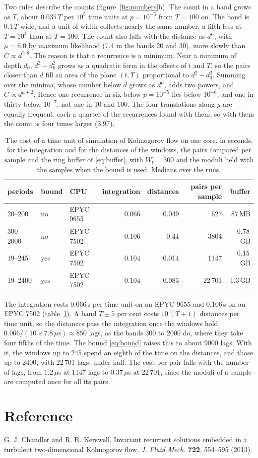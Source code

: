 \documentclass[11pt]{article}
\begin{document}
Two rules describe the counts (figure~\ref{fig:numbers}b). The count in a band grows as $T$, about $0.035\,T$ per $10^5$ time units at $p = 10^{-5}$ from $T = 100$ on. The band is $0.1\,T$ wide, and a unit of width collects nearly the same number, a fifth less at $T = 10^4$ than at $T = 100$. The count also falls with the distance as $d^{\mu}$, with $\mu = 6.0$ by maximum likelihood (7.4 in the bands 20 and 30), more slowly than $C \propto d^{7\text{--}8}$. The reason is that a recurrence is a minimum. Near a minimum of depth $d_0$, $d^2 - d_0^2$ grows as a quadratic form in the offsets of $t$ and $T$, so the pairs closer than $d$ fill an area of the plane $(t, T)$ proportional to $d^2 - d_0^2$. Summing over the minima, whose number below $d$ grows as $d^{\mu}$, adds two powers, and $C \propto d^{\mu + 2}$. Hence one recurrence in six below $p = 10^{-5}$ lies below $10^{-6}$, and one in thirty below $10^{-7}$, not one in 10 and 100. The four translations along $y$ are equally frequent, each a quarter of the recurrences found with them, so with them the count is four times larger (3.97).

\begin{table}[t]
\centering
\caption{The cost of a time unit of simulation of Kolmogorov flow on one core, in seconds, for the integration and for the distances of the windows, the pairs compared per sample and the ring buffer of \eqref{eq:buffer}, with $W_t = 300$ and the moduli held with the samples when the bound is used. Medians over the runs.}
\label{tab:cost}
\small
\begin{tabular}{l l l r r r r}
\toprule
periods & bound & CPU & integration & distances & pairs per sample & buffer \\
\midrule
20--200 & no & EPYC 9655 & 0.066 & 0.049 & 627 & 87\,MB \\
300--2000 & no & EPYC 7502 & 0.106 & 0.44 & 3804 & 0.78\,GB \\
19--245 & yes & EPYC 7502 & 0.104 & 0.014 & 1147 & 0.15\,GB \\
19--2400 & yes & EPYC 7502 & 0.104 & 0.083 & 22\,701 & 1.3\,GB \\
\bottomrule
\end{tabular}
\end{table}

The integration costs 0.066\,s per time unit on an EPYC 9655 and 0.106\,s on an EPYC 7502 (table~\ref{tab:cost}). A band $T \pm 5$ per cent costs $10\,(T + 1)$ distances per time unit, so the distances pass the integration once the windows hold $0.066/(10 \times 7.8\,\mu\mathrm{s}) \approx 850$ lags, as the bands 300 to 2000 do, where they take four fifths of the time. The bound \eqref{eq:bound} raises this to about 9000 lags. With it, the windows up to 245 spend an eighth of the time on the distances, and those up to 2400, with 22\,701 lags, under half. The cost per pair falls with the number of lags, from $1.2\,\mu$s at 1147 lags to $0.37\,\mu$s at 22\,701, since the moduli of a sample are computed once for all its pairs.

\section*{Reference}

G. J. Chandler and R. R. Kerswell, Invariant recurrent solutions embedded in a turbulent two-dimensional Kolmogorov flow, \emph{J. Fluid Mech.} \textbf{722}, 554--595 (2013).
\end{document}
